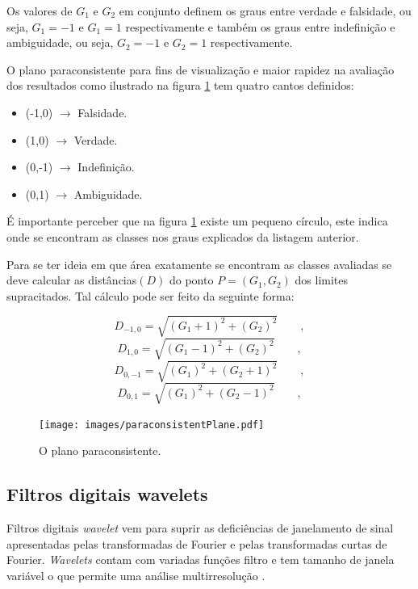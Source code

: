 \begin{myenv}{1.5}
				\par Os valores de $G_1$ e $G_2$ em conjunto definem os graus entre verdade e falsidade, ou seja, $G_1=-1$ e $G_1=1$ respectivamente e também os graus entre indefinição e ambiguidade, ou seja, $G_2=-1$ e $G_2=1$ respectivamente.
				\par O plano paraconsistente para fins de visualização e maior rapidez na avaliação dos resultados como ilustrado na figura \ref{fig:paraconsistentplane} tem quatro cantos definidos:
				\begin{itemize}
					\item (-1,0) $\rightarrow$ Falsidade.
					\item (1,0) $\rightarrow$ Verdade.
					\item (0,-1) $\rightarrow$ Indefinição.
					\item (0,1) $\rightarrow$ Ambiguidade.
				\end{itemize}
				\par É importante perceber que na figura \ref{fig:paraconsistentplane} existe um pequeno círculo, este indica onde se encontram as classes nos graus explicados da listagem anterior.
				\par Para se ter ideia em que área exatamente se encontram as classes avaliadas se deve calcular as distâncias$(D)$ do ponto $P=(G_1,G_2)$ dos limites supracitados. Tal cálculo pode ser feito da seguinte forma:

				\begin{equation}
					D_{-1,0}=\sqrt{(G_1+1)^2+(G_2)^2}\qquad,
				\end{equation}
				\begin{equation}
					D_{1,0}=\sqrt{(G_1-1)^2+(G_2)^2}\qquad,
				\end{equation}
				\begin{equation}
					D_{0,-1}=\sqrt{(G_1)^2+(G_2+1)^2}\qquad,		
				\end{equation}
				\begin{equation}
					D_{0,1}=\sqrt{(G_1)^2+(G_2-1)^2}\qquad,
				\end{equation}		

				\begin{figure}[h]
					\centering
					\texttt{[image: images/paraconsistentPlane.pdf]}
					\caption{O plano paraconsistente.}
					\label{fig:paraconsistentplane}
				\end{figure}

			\subsection{Filtros digitais wavelets}
				\par Filtros digitais \textit{wavelet} vem para suprir as deficiências de janelamento de sinal apresentadas pelas transformadas de Fourier e pelas transformadas curtas de Fourier. \textit{Wavelets} contam com variadas funções filtro e tem tamanho de janela variável o que permite uma análise multirresolução \cite{Rod5254905}.
				

\end{myenv}
